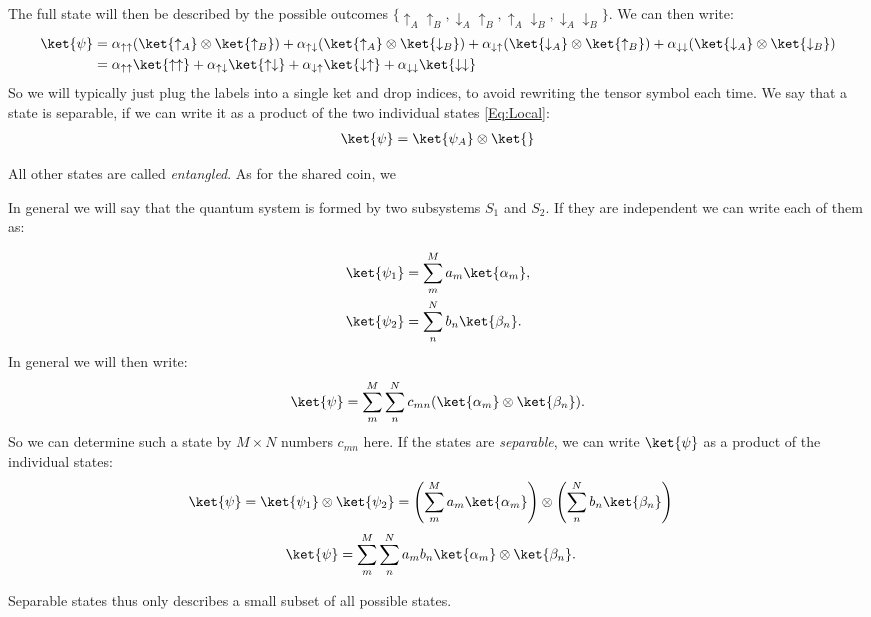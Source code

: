 The full state will then be described by the possible outcomes $\{\uparrow_A\uparrow_B,\downarrow_A\uparrow_B,\uparrow_A\downarrow_B, \downarrow_A\downarrow_B\}$. We can then write:
\begin{align}
\ket{\psi} &= \alpha_{\uparrow\uparrow}(\ket{\uparrow_A}\otimes\ket{\uparrow_B})+\alpha_{\uparrow\downarrow}(\ket{\uparrow_A}\otimes\ket{\downarrow_B})+\alpha_{\downarrow\uparrow}(\ket{\downarrow_A}\otimes\ket{\uparrow_B})+\alpha_{\downarrow\downarrow}(\ket{\downarrow_A}\otimes\ket{\downarrow_B})\\
&= \alpha_{\uparrow\uparrow}\ket{\uparrow\uparrow}+\alpha_{\uparrow\downarrow}\ket{\uparrow\downarrow}+\alpha_{\downarrow\uparrow}\ket{\downarrow \uparrow}+\alpha_{\downarrow\downarrow}\ket{\downarrow\downarrow}
\end{align}
So we will typically just plug the labels into a single ket and drop indices, to avoid rewriting the tensor symbol each time. We say that a state is separable, if we can write it as a product of the two individual states \eqref{Eq:Local}:
\begin{align}
\ket{\psi} = \ket{\psi_A}\otimes\ket{}
\end{align}

All other states are called \textit{entangled}. As for the shared coin, we


In general we will say that the quantum system is formed by two subsystems $S_1$ and $S_2$. If they are independent we can write each of them as:

\begin{align}
				\ket{\psi_1}&=\sum_m^M a_m \ket{\alpha_m},\\
				\ket{\psi_2}&=\sum_n^N b_n \ket{\beta_n}.
			
\end{align}
In general we will then write:
\begin{align}
\ket{\psi}=\sum_m^M \sum_n^N c_{mn}(\ket{\alpha_m}\otimes \ket{\beta_n}).
\end{align}
So we can determine such a state by $M \times N$ numbers $c_{mn}$ here.  If the states are \textit{separable}, we can write $\ket{\psi}$ as a product of the individual states:
\begin{align}
 \label{eq:psientangled} 
	\ket{\psi}	&=\ket{\psi_1}\otimes\ket{\psi_2}=\left(\sum_m^M a_m \ket{\alpha_m}\right) \otimes \left(\sum_n^N b_n \ket{\beta_n}\right)
\end{align}
\begin{align}
\ket{\psi}	&=\sum_m^M \sum_n^N a_m b_n \ket{\alpha_m} \otimes \ket{\beta_n}. \label{eq:psientangled3} 
\end{align}

Separable states thus only describes a small subset of all possible states. 